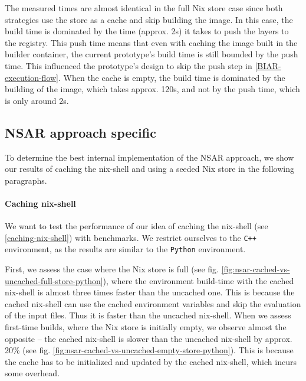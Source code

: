 The measured times are almost identical in the full Nix store case since both strategies use the store as a cache and skip building the image. In this case, the build time is dominated by the time (approx. 2s) it takes to push the layers to the registry. This push time means that even with caching the image built in the builder container, the current prototype's build time is still bounded by the push time. This influenced the prototype's design to skip the push step in \ref{BIAR-execution-flow}. When the cache is empty, the build time is dominated by the building of the image, which takes approx. 120s, and not by the push time, which is only around 2s.

\subsection{NSAR approach specific}
To determine the best internal implementation of the NSAR approach, we show our results of caching the nix-shell and using a seeded Nix store in the following paragraphs.

\paragraph{Caching nix-shell}
We want to test the performance of our idea of caching the nix-shell (see \ref{caching-nix-shell}) with benchmarks. We restrict ourselves to the \verb|C++| environment, as the results are similar to the \verb|Python| environment.

First, we assess the case where the Nix store is full (see fig. \ref{fig:nsar-cached-vs-uncached-full-store-python}), where the environment build-time with the cached nix-shell is almost three times faster than the uncached one. This is because the cached nix-shell can use the cached environment variables and skip the evaluation of the input files. Thus it is faster than the uncached nix-shell. When we assess first-time builds, where the Nix store is initially empty, we observe almost the opposite -- the cached nix-shell is slower than the uncached nix-shell by approx. 20\% (see fig. \ref{fig:nsar-cached-vs-uncached-empty-store-python}). This is because the cache has to be initialized and updated by the cached nix-shell, which incurs some overhead.

